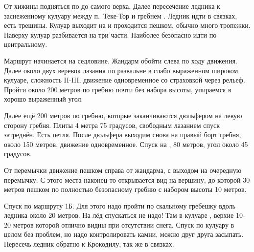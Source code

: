 От хижины \geoLighthouse{} подняться по  до самого верха. Далее пересечение ледника к заснеженному
кулуару между п.~Теке-Тор и гребнем \geoPeakBoks{}. Ледник идти в
связках, есть трещины. Кулуар выходит на \geoPassTekeTor{} и
проходится пешком, обычно много тропежки. Наверху кулуар разбивается
на три части. Наиболее безопасно идти по центральному.

Маршрут начинается на седловине. Жандарм обойти слева по ходу
движения. Далее около двух веревок лазания по развальне в слабо
выраженном широком кулуаре, сложность II-III, движение одновременное
со страховкой через рельеф. Пройти около 200 метров по гребню почти
без набора высоты, упираемся в хорошо выраженный угол: 

Далее ещё 200 метров по гребню, которые заканчиваются дюльфером на
левую сторону гребня. Плиты 4 метра 75 градусов, свободным лазанием
спуск затреднён. Есть петля. После дюльфера выходим снова на правый
борт гребня, около 150 метров, движение одновременное. Спуск на
, 80 метров, угол около 45
градусов.

От перемычки движение пешком справа от жандарма, с выходом на
очередную перемычку. С этого места наконец-то открывается вид на
вершину, до которой 30 метров пешком по полностью безопасному гребню с
набором высоты 10 метров.

Спуск по маршруту 1Б. Для этого надо пройти по скальному гребешку
вдоль ледника около 20 метров. На лёд спускаться не надо! Там в
кулуаре ,
верхие 10-20 метров которой отлично видны при отсутствии снега. Спуск
по кулуару в целом без проблем, но надо контролировать камни, можно
друг друга засыпать. Пересечь ледник обратно к Крокодилу, так же в
связках.
